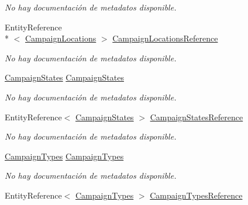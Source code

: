 \begin{DoxyCompactItemize}
\begin{DoxyCompactList}\small\item\em No hay documentación de metadatos disponible. \end{DoxyCompactList}\item 
Entity\-Reference\\*
$<$ \hyperlink{class_game_memory_1_1_campaign_locations}{Campaign\-Locations} $>$ \hyperlink{class_game_memory_1_1_advert_campaigns_a1fbf3e6ceb5391084f9510ca735847de}{Campaign\-Locations\-Reference}
\begin{DoxyCompactList}\small\item\em No hay documentación de metadatos disponible. \end{DoxyCompactList}\item 
\hyperlink{class_game_memory_1_1_campaign_states}{Campaign\-States} \hyperlink{class_game_memory_1_1_advert_campaigns_ab254e90abef7201a8b4a9cb314df6e1b}{Campaign\-States}
\begin{DoxyCompactList}\small\item\em No hay documentación de metadatos disponible. \end{DoxyCompactList}\item 
Entity\-Reference$<$ \hyperlink{class_game_memory_1_1_campaign_states}{Campaign\-States} $>$ \hyperlink{class_game_memory_1_1_advert_campaigns_a2b666e7a41a4408e76ca8cb79c99ad7b}{Campaign\-States\-Reference}
\begin{DoxyCompactList}\small\item\em No hay documentación de metadatos disponible. \end{DoxyCompactList}\item 
\hyperlink{class_game_memory_1_1_campaign_types}{Campaign\-Types} \hyperlink{class_game_memory_1_1_advert_campaigns_a2248329f3b61f4745a02e612e9f597bb}{Campaign\-Types}
\begin{DoxyCompactList}\small\item\em No hay documentación de metadatos disponible. \end{DoxyCompactList}\item 
Entity\-Reference$<$ \hyperlink{class_game_memory_1_1_campaign_types}{Campaign\-Types} $>$ \hyperlink{class_game_memory_1_1_advert_campaigns_ade5c3b4524c9c97b3ecd4e584839217c}{Campaign\-Types\-Reference}

\end{DoxyCompactItemize}
